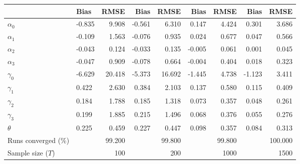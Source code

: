 
\begin{tabular}[t]{llrrrrrrr}
\toprule
  & Bias & RMSE & Bias & RMSE & Bias & RMSE & Bias & RMSE\\
\midrule
$\alpha_{0}$ & -0.835 & 9.908 & -0.561 & 6.310 & 0.147 & 4.424 & 0.301 & 3.686\\
$\alpha_{1}$ & -0.109 & 1.563 & -0.076 & 0.935 & 0.024 & 0.677 & 0.047 & 0.566\\
$\alpha_{2}$ & -0.043 & 0.124 & -0.033 & 0.135 & -0.005 & 0.061 & 0.001 & 0.045\\
$\alpha_{3}$ & -0.047 & 0.909 & -0.078 & 0.664 & -0.004 & 0.404 & 0.018 & 0.323\\
$\gamma_{0}$ & -6.629 & 20.418 & -5.373 & 16.692 & -1.445 & 4.738 & -1.123 & 3.411\\
$\gamma_{1}$ & 0.422 & 2.630 & 0.384 & 2.103 & 0.137 & 0.580 & 0.115 & 0.409\\
$\gamma_{2}$ & 0.184 & 1.788 & 0.185 & 1.318 & 0.073 & 0.357 & 0.048 & 0.261\\
$\gamma_{3}$ & 0.199 & 1.885 & 0.215 & 1.496 & 0.068 & 0.376 & 0.055 & 0.276\\
$\theta$ & 0.225 & 0.459 & 0.227 & 0.447 & 0.098 & 0.357 & 0.084 & 0.313\\
Runs converged (\%) &  & 99.200 &  & 99.800 &  & 99.800 &  & 100.000\\
Sample size ($T$) &  & 100 &  & 200 &  & 1000 &  & 1500\\
\bottomrule
\end{tabular}
